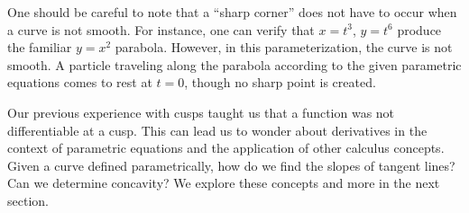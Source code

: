 One should be careful to note that a ``sharp corner'' does not have to occur when a curve is not smooth. For instance, one can verify that $x=t^3$, $y=t^6$ produce the familiar $y=x^2$ parabola. However, in this parameterization, the curve is not smooth. A particle traveling along the parabola according to the given parametric equations comes to rest at $t=0$, though no sharp point is created.\bigskip

Our previous experience with cusps taught us that a function was not differentiable at a cusp. This can lead us to wonder about derivatives in the context of parametric equations and the application of other calculus concepts. Given a curve defined parametrically, how do we find the slopes of tangent lines? Can we determine concavity? We explore these concepts and more in the next section.

